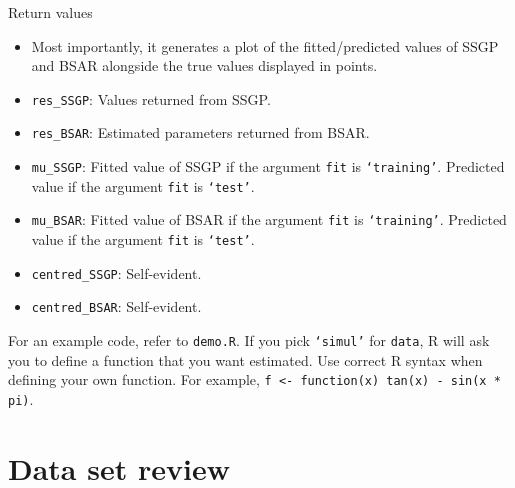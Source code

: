 \documentclass[11pt]{article}
\begin{document}
  Return values
    \begin{itemize}
      \item Most importantly, it generates a plot of the fitted/predicted values of SSGP and BSAR alongside the true values displayed in points.
      \item \texttt{res\_SSGP}: Values returned from SSGP.
      \item \texttt{res\_BSAR}: Estimated parameters returned from BSAR.
      \item \texttt{mu\_SSGP}: Fitted value of SSGP if the argument \texttt{fit} is \texttt{`training'}. Predicted value if the argument \texttt{fit} is \texttt{`test'}.
      \item \texttt{mu\_BSAR}: Fitted value of BSAR if the argument \texttt{fit} is \texttt{`training'}. Predicted value if the argument \texttt{fit} is \texttt{`test'}.
      \item \texttt{centred\_SSGP}: Self-evident.
      \item \texttt{centred\_BSAR}: Self-evident.
    \end{itemize}
For an example code, refer to \texttt{demo.R}. If you pick \texttt{`simul'} for \texttt{data}, \textsf{R} will ask you to define a function that you want estimated. Use correct \textsf{R} syntax when defining your own function. For example,
\texttt{f <- function(x) tan(x) - sin(x * pi)}.
\section{Data set review}
  
\end{document}
